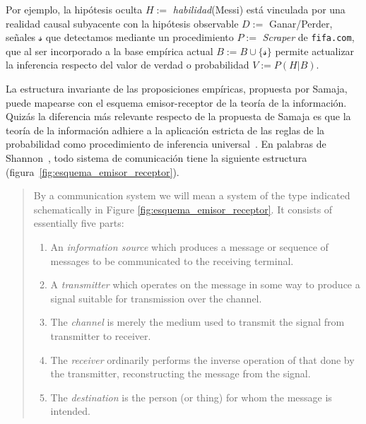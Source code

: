 \documentclass[a4paper,11pt]{book}
\theoremstyle{definition}
\begin{document}
%
Por ejemplo, la hip\'otesis oculta $H:=$ \emph{habilidad}(Messi) est\'a vinculada por una realidad causal subyacente con la hip\'otesis observable $D:=$ Ganar/Perder, se\~nales $\mathcal{s}$ que detectamos mediante un procedimiento $P:=$ \emph{Scraper} de \texttt{fifa.com}, que al ser incorporado a la base emp\'irica actual $B:= B \cup \{ \mathcal{s}\} $ permite actualizar la inferencia respecto del valor de verdad o probabilidad $V:= P(H|B)$.


La estructura invariante de las proposiciones emp\'iricas, propuesta por Samaja, puede mapearse con el esquema emisor-receptor de la teor\'ia de la informaci\'on.
%
Quiz\'as la diferencia m\'as relevante respecto de la propuesta de Samaja es que la teor\'ia de la informaci\'on adhiere a la aplicaci\'on estricta de las reglas de la probabilidad como procedimiento de inferencia universal~\cite{Mackay2003}.
%
En palabras de Shannon~\cite{shannon1948-theoryOfCommunication}, todo sistema de comunicaci\'on tiene la siguiente estructura (figura~\ref{fig:esquema_emisor_receptor}).
%
\begin{quotation}
By a communication system we will mean a system of the type indicated schematically in Figure \ref{fig:esquema_emisor_receptor}. It consists of essentially five parts:
 \begin{enumerate} \setlength\itemsep{-0.05cm}
  \item An \emph{information source} which produces a message or sequence of messages to be communicated to the receiving terminal.
  \item A \emph{transmitter} which operates on the message in some way to produce a signal suitable for transmission over the channel.
  \item The \emph{channel} is merely the medium used to transmit the signal from transmitter to receiver.
  \item The \emph{receiver} ordinarily performs the inverse operation of that done by the transmitter, reconstructing the message from the signal.
  \item The \emph{destination} is the person (or thing) for whom the message is intended.
 \end{enumerate}
\end{quotation}
%
\end{document}
